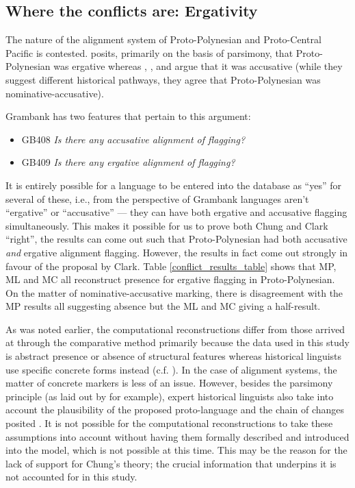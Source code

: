 \documentclass[a4paper,10pt]{article} %
\begin{document}
\subsection{Where the conflicts are: Ergativity}
The nature of the alignment system of Proto-Polynesian and Proto-Central Pacific is contested. \citet{clark1976aspects} posits, primarily on the basis of parsimony, that Proto-Polynesian was ergative whereas \citet{hale_1968}, \citet{hohepa_1967,hohepa_1969}, and \citet{chung1978} argue that it was accusative (while they suggest different historical pathways, they agree that Proto-Polynesian was nominative-accusative).

Grambank has two features that pertain to this argument:

\begin{itemize}
\item GB408 \emph{Is there any accusative alignment of flagging?}
\item GB409 \emph{Is there any ergative alignment of flagging?}
\end{itemize}

It is entirely possible for a language to be entered into the database as ``yes'' for several of these, i.e., from the perspective of Grambank languages aren't ``ergative'' or ``accusative'' --- they can have both ergative and accusative flagging simultaneously. This makes it possible for us to prove both Chung and Clark ``right'', the results can come out such that Proto-Polynesian had both accusative \emph{and} ergative alignment flagging. However, the results in fact come out strongly in favour of the proposal by Clark. Table \ref{conflict_results_table} shows that MP, ML and MC all reconstruct presence for ergative flagging in Proto-Polynesian. On the matter of nominative-accusative marking, there is disagreement with the MP results all suggesting absence but the ML and MC giving a half-result.

\newcommand{\pb}[1]{\parbox[t][][t]{1\linewidth}{#1} \vspace{3.5pt}}


As was noted earlier, the computational reconstructions differ from those arrived at through the comparative method primarily because the data used in this study is abstract presence or absence of structural features whereas historical linguists use specific concrete forms instead (c.f. \citet{crowley1985common}). In the case of alignment systems, the matter of concrete markers is less of an issue. However, besides the parsimony principle (as laid out by \citet[19]{clark1976aspects} for example), expert historical linguists also take into account the plausibility of the proposed proto-language and the chain of changes posited \citep{chung1977aspects}. It is not possible for the computational reconstructions to take these assumptions into account without having them formally described and introduced into the model, which is not possible at this time. This may be the reason for the lack of support for Chung's theory; the crucial information that underpins it is not accounted for in this study.
\end{document}
